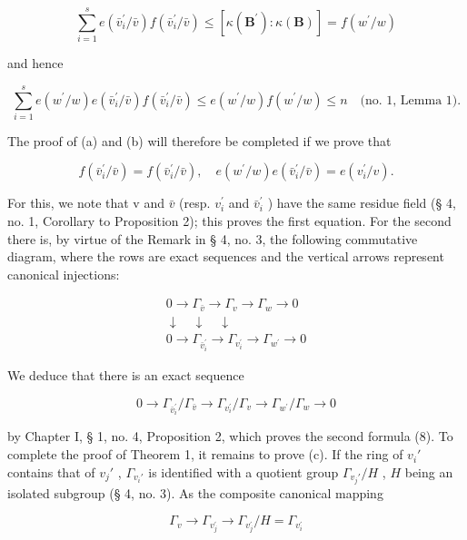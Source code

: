 \[
\sum_ {i = 1} ^ {s} e \left(\bar {v} _ {i} ^ {\prime} / \bar {v}\right) f \left(\bar {v} _ {i} ^ {\prime} / \bar {v}\right) \leqslant \left[ \kappa \left(\mathbf {B} ^ {\prime}\right): \kappa (\mathbf {B}) \right] = f \left(w ^ {\prime} / w\right)
\]

and hence

\[
\sum_ {i = 1} ^ {s} e (w ^ {\prime} / w) e (\bar {v} _ {i} ^ {\prime} / \bar {v}) f (\bar {v} _ {i} ^ {\prime} / \bar {v}) \leqslant e (w ^ {\prime} / w) f (w ^ {\prime} / w) \leqslant n \quad \text {(no. 1, Lemma 1)}.
\]

The proof of (a) and (b) will therefore be completed if we prove that

\[
f (\bar {v} _ {i} ^ {\prime} / \bar {v}) = f (\bar {v} _ {i} ^ {\prime} / \bar {v}), \quad e (w ^ {\prime} / w) e (\bar {v} _ {i} ^ {\prime} / \bar {v}) = e (v _ {i} ^ {\prime} / v).\tag{8}
\]

For this, we note that v and \(\bar{v}\) (resp. \(v_{i}^{\prime}\) and \(\bar{v}_{i}^{\prime}\) ) have the same residue field (§ 4, no. 1, Corollary to Proposition 2); this proves the first equation. For the second there is, by virtue of the Remark in § 4, no. 3, the following commutative diagram, where the rows are exact sequences and the vertical arrows represent canonical injections:

\[
\begin{array}{c} 0 \to \Gamma_ {\bar {v}} \to \Gamma_ {v} \to \Gamma_ {w} \to 0 \\ \downarrow \quad \downarrow \quad \downarrow \\ 0 \to \Gamma_ {\bar {v} _ {i} ^ {\prime}} \to \Gamma_ {v _ {i} ^ {\prime}} \to \Gamma_ {w ^ {\prime}} \to 0 \end{array}
\]

We deduce that there is an exact sequence

\[
0 \rightarrow \Gamma_ {\bar {v} _ {i} ^ {\prime}} / \Gamma_ {\bar {v}} \rightarrow \Gamma_ {v _ {i} ^ {\prime}} / \Gamma_ {v} \rightarrow \Gamma_ {w ^ {\prime}} / \Gamma_ {w} \rightarrow 0
\]

by Chapter I, § 1, no. 4, Proposition 2, which proves the second formula (8). To complete the proof of Theorem 1, it remains to prove (c). If the ring of \(v_i'\) contains that of \(v_j'\) , \(\Gamma_{v_i'}\) is identified with a quotient group \(\Gamma_{v_j'} / H\) , \(H\) being an isolated subgroup (§ 4, no. 3). As the composite canonical mapping

\[
\Gamma_ {v} \rightarrow \Gamma_ {v _ {j} ^ {\prime}} \rightarrow \Gamma_ {v _ {j} ^ {\prime}} / H = \Gamma_ {v _ {i} ^ {\prime}}
\]

